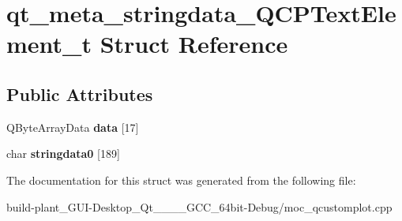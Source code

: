 \hypertarget{structqt__meta__stringdata__QCPTextElement__t}{}\section{qt\+\_\+meta\+\_\+stringdata\+\_\+\+Q\+C\+P\+Text\+Element\+\_\+t Struct Reference}
\label{structqt__meta__stringdata__QCPTextElement__t}
\subsection*{Public Attributes}
\begin{DoxyCompactItemize}
\item 
\mbox{\label{structqt__meta__stringdata__QCPTextElement__t_aea7ed3e03af38c139400f8c837a108bf}} 
Q\+Byte\+Array\+Data {\bfseries data} \mbox{[}17\mbox{]}
\item 
\mbox{\label{structqt__meta__stringdata__QCPTextElement__t_a7307363ad48472f7f131b7b59640d43b}} 
char {\bfseries stringdata0} \mbox{[}189\mbox{]}
\end{DoxyCompactItemize}


The documentation for this struct was generated from the following file\+:\begin{DoxyCompactItemize}
\item 
build-\/plant\+\_\+\+G\+U\+I-\/\+Desktop\+\_\+\+Qt\+\_\+\_\+\_\+\_\+\+G\+C\+C\+\_\+64bit-\/\+Debug/moc\+\_\+qcustomplot.\+cpp\end{DoxyCompactItemize}
